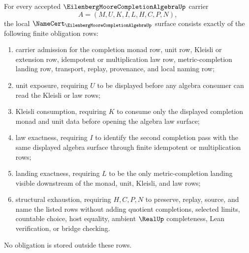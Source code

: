 \begin{theorem}
\label{thm:eilenberg-moore-completion-algebra-namecert-obligations}
For every accepted $\EilenbergMooreCompletionAlgebraUp$ carrier
$$
A=(M,U,K,I,L,H,C,P,N),
$$
the local $\NameCert_{\EilenbergMooreCompletionAlgebraUp}$ surface consists exactly of the following finite obligation rows:
\begin{enumerate}
\item carrier admission for the completion monad row, unit row, Kleisli or extension row, idempotent or multiplication law row, metric-completion landing row, transport, replay, provenance, and local naming row;
\item unit exposure, requiring $U$ to be displayed before any algebra consumer can read the Kleisli or law rows;
\item Kleisli consumption, requiring $K$ to consume only the displayed completion monad and unit data before opening the algebra law surface;
\item law exactness, requiring $I$ to identify the second completion pass with the same displayed algebra surface through finite idempotent or multiplication rows;
\item landing exactness, requiring $L$ to be the only metric-completion landing visible downstream of the monad, unit, Kleisli, and law rows;
\item structural exhaustion, requiring $H,C,P,N$ to preserve, replay, source, and name the listed rows without adding quotient completions, selected limits, countable choice, host equality, ambient $\RealUp$ completeness, Lean verification, or bridge checking.
\end{enumerate}
No obligation is stored outside these rows.
\end{theorem}
